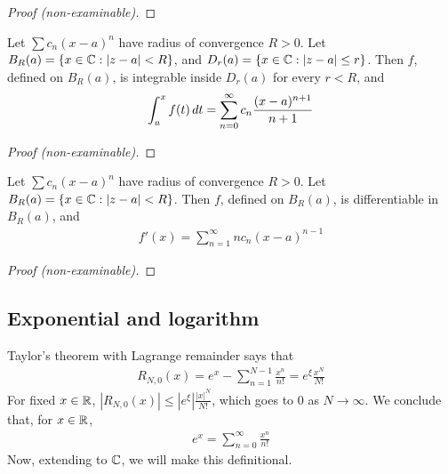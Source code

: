 \documentclass{../template/note}
\begin{document}
    \begin{proof}[Proof (non-examinable)]
    \end{proof}

    \begin{proposition}
        Let \(\sum c_n(x-a)^n\) have radius of convergence \(R > 0\). Let \(B_R(a) = \{x \in \mathbb C: |z-a| < R\}\), and \(D_r(a) = \{x \in \mathbb C: |z-a| \leq r\}\). Then \(f\), defined on \(B_R(a)\), is integrable inside \(D_r(a)\) for every \(r < R\), and
        \begin{align*}
            \int_a^x f(t) \,d{t} = \sum_{n=0}^\infty c_n \frac{(x-a)^{n+1}}{n+1}
        \end{align*}
    \end{proposition}
    
    \begin{proof}[Proof (non-examinable)]
    \end{proof}

    \begin{proposition}
        Let \(\sum c_n(x-a)^n\) have radius of convergence \(R > 0\). Let \(B_R(a) = \{x \in \mathbb C: |z-a| < R\}\). Then \(f\), defined on \(B_R(a)\), is differentiable in \(B_R(a)\), and 
        \begin{align*}
            f'(x) = \sum_{n=1}^\infty nc_n(x-a)^{n-1}
        \end{align*}
    \end{proposition}
    
    \begin{proof}[Proof (non-examinable)]
    \end{proof}
    
    
    


    \subsection{Exponential and logarithm}
    
    Taylor's theorem with Lagrange remainder says that
    \begin{align*}
        R_{N,0}(x) = e^x - \sum_{n=1}^{N-1} \frac{x^n}{n!} = e^\xi \frac{x^N}{N!}
    \end{align*}
    For fixed \(x \in \mathbb R\), \(|R_{N,0}(x)| \leq |e^\xi| \frac{|x|^N}{N!}\), which goes to 0 as \(N \to \infty\). We conclude that, for \(x \in \mathbb R\),
    \begin{align*}
        e^x = \sum_{n=0}^\infty \frac{x^n}{n!}
    \end{align*}
    Now, extending to \(\mathbb C\), we will make this definitional.
\end{document}
